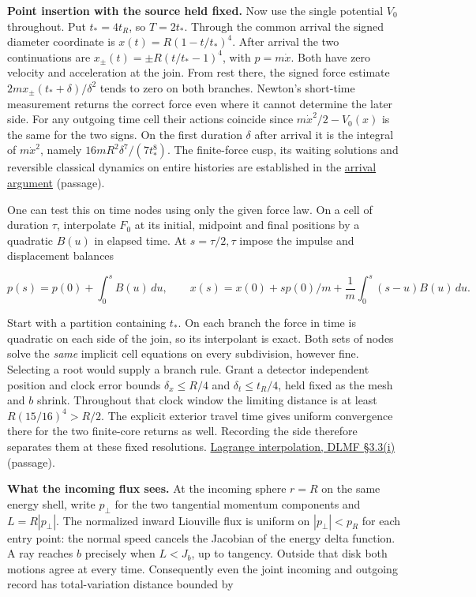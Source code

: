 \documentclass[11pt,a4paper]{article}
\begin{document}
\textbf{Point insertion with the source held fixed.} Now use the single
potential \(V_0\) throughout. Put \(t_*=4t_R\), so \(T=2t_*\). Through
the common arrival the signed diameter coordinate is
\(x(t)=R(1-t/t_*)^4\). After arrival the two continuations are
\(x_\pm(t)=\pm R(t/t_*-1)^4\), with \(p=m\dot x\). Both have zero
velocity and acceleration at the join. From rest there, the signed force
estimate \(2m x_\pm(t_*+\delta)/\delta^2\) tends to zero on both
branches. Newton's short-time measurement returns the correct force even
where it cannot determine the later side. For any outgoing time cell
their actions coincide since \(m\dot x^2/2-V_0(x)\) is the same for the
two signs. On the first duration \(\delta\) after arrival it is the
integral of \(m\dot x^2\), namely \(16mR^2\delta^7/(7t_*^8)\). The
finite-force cusp, its waiting solutions and reversible classical
dynamics on entire histories are established in the
\href{newton-cusp-preparation-floor.md}{arrival argument} (passage).

One can test this on time nodes using only the given force law. On a
cell of duration \(\tau\), interpolate \(F_0\) at its initial, midpoint
and final positions by a quadratic \(B(u)\) in elapsed time. At
\(s=\tau/2,\tau\) impose the impulse and displacement balances

\[
 p(s)=p(0)+\int_0^s B(u)\,du,\qquad
 x(s)=x(0)+s p(0)/m+\frac1m\int_0^s(s-u)B(u)\,du .
\]

Start with a partition containing \(t_*\). On each branch the force in
time is quadratic on each side of the join, so its interpolant is exact.
Both sets of nodes solve the \emph{same} implicit cell equations on
every subdivision, however fine. Selecting a root would supply a branch
rule. Grant a detector independent position and clock error bounds
\(\delta_x\le R/4\) and \(\delta_t\le t_R/4\), held fixed as the mesh
and \(b\) shrink. Throughout that clock window the limiting distance is
at least \(R(15/16)^4>R/2\). The explicit exterior travel time gives
uniform convergence there for the two finite-core returns as well.
Recording the side therefore separates them at these fixed resolutions.
\href{https://dlmf.nist.gov/3.3.i}{Lagrange interpolation, DLMF §3.3(i)}
(passage).

\textbf{What the incoming flux sees.} At the incoming sphere \(r=R\) on
the same energy shell, write \(p_\perp\) for the two tangential momentum
components and \(L=R|p_\perp|\). The normalized inward Liouville flux is
uniform on \(|p_\perp|<p_R\) for each entry point: the normal speed
cancels the Jacobian of the energy delta function. A ray reaches \(b\)
precisely when \(L<J_b\), up to tangency. Outside that disk both motions
agree at every time. Consequently even the joint incoming and outgoing
record has total-variation distance bounded by
\end{document}
